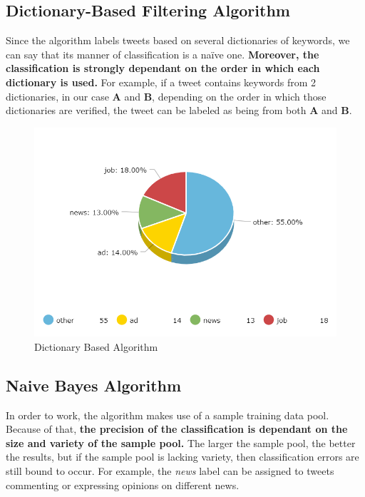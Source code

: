 \documentclass{article}
\begin{document}
\newpage

\clearpage
\vspace*{\fill}

\subsection{Dictionary-Based Filtering Algorithm}
\large
{
\quad
Since the algorithm labels tweets based on several dictionaries of keywords, we can say that its manner of classification is a naïve one. \textbf{Moreover, the classification is strongly dependant on the order in which each dictionary is used.} For example, if a tweet contains keywords from 2 dictionaries, in our case \textbf{A} and \textbf{B}, depending on the order in which those dictionaries are verified, the tweet can be labeled as being from both \textbf{A} and \textbf{B}. 
}

\begin{figure}[H]
    \centering
    \includegraphics[width=\linewidth]{figures/DictionaryBasedAlg}
    \caption{Dictionary Based Algorithm}
\end{figure}

\vfill 
\clearpage
\newpage

\clearpage
\vspace*{\fill}

\subsection{Naive Bayes Algorithm}
\large
{
\quad
In order to work, the algorithm makes use of a sample training data pool. Because of that, \textbf{the precision of the classification is dependant on the size and variety of the sample pool.} The larger the sample pool, the better the results, but if the sample pool is lacking variety, then classification errors are still bound to occur. For example, the \textit{news} label can be assigned to tweets commenting or expressing opinions on different news.
}
\end{document}
